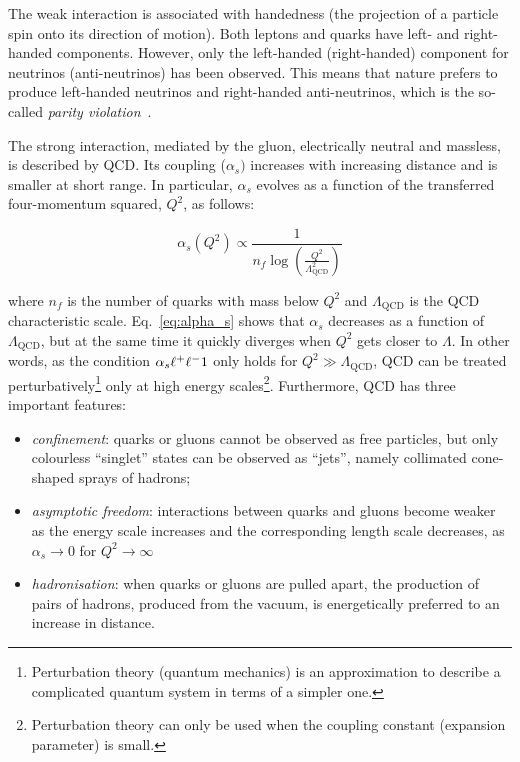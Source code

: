 			The weak interaction is associated with handedness (the projection of a particle spin onto its direction of motion). Both leptons and quarks have left- and right-handed components. However, only the left-handed (right-handed) component for neutrinos (anti-neutrinos) has been observed. This means that nature prefers to produce left-handed neutrinos and right-handed anti-neutrinos, which is the so-called \textit{parity violation}~\cite{Weinberg:1996kr}. 

			The strong interaction, mediated by the gluon, electrically neutral and massless, is described by \ac{QCD}. Its coupling ($\alpha_s)$ increases with increasing distance and is smaller at short range. In particular, $\alpha_s$ evolves as a function of the transferred four-momentum squared, $Q^2$, as follows: 

			\begin{equation}
				\label{eq:alpha_s}
				\alpha_s (Q^2) \propto \displaystyle \frac{1}{n_f \log (\frac{Q^2}{\Lambda_{\mathrm{QCD}}^2})} 
			\end{equation}

			\noindent where $n_f$ is the number of quarks with mass below $Q^2$ and $\Lambda_{\mathrm{QCD}}$ is the \ac{QCD} characteristic scale. Eq.~\ref{eq:alpha_s} shows that $\alpha_s$ decreases as a function of $\Lambda_{\mathrm{QCD}}$, but at the same time it quickly diverges when $Q^2$ gets closer to $\Lambda$. In other words, as the condition $\alpha_s \muchless 1$ only holds for $Q^2 \gg \Lambda_{\mathrm{QCD}}$, \ac{QCD} can be treated perturbatively\footnote{Perturbation theory (quantum mechanics) is an approximation to describe a complicated quantum system in terms of a simpler one.} only at high energy scales\footnote{Perturbation theory can only be used when the coupling constant (expansion parameter) is small.}. Furthermore, \ac{QCD} has three important features:

			\begin{itemize}
				\item \emph{confinement}: quarks or gluons cannot be observed as free particles, but only colourless “singlet” states can be observed as “jets”, namely collimated cone-shaped sprays of hadrons; 

				\item \emph{asymptotic freedom}: interactions between quarks and gluons become weaker as the energy scale increases and the corresponding length scale decreases, as $\alpha_s \to 0$ for $Q^2 \to \infty$~%

				\item \emph{hadronisation}: when quarks or gluons are pulled apart, the production of pairs of hadrons, produced from the vacuum, is energetically preferred to an increase in distance.
			\end{itemize}

